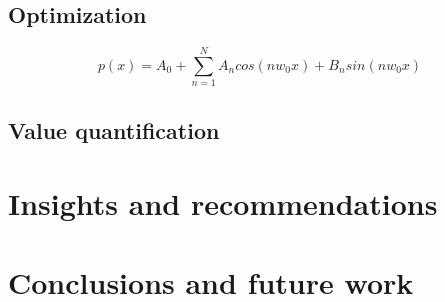 \documentclass[article]{proc}
\begin{document}
\subsection{Optimization}





\begin{equation}
p(x) = A_0 + \sum_{n=1}^{N} A_ncos(nw_0x) + B_nsin(nw_0x)
\label{eq:fourier_poly}
\end{equation}

\subsection{Value quantification}




\section{Insights and recommendations}


\section{Conclusions and future work}





\scriptsize{

}
\end{document}
